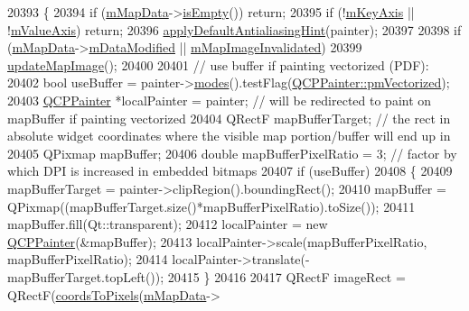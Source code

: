 \begin{DoxyCode}
20393 \{
20394   \textcolor{keywordflow}{if} (\hyperlink{class_q_c_p_color_map_a8709272aa8f0be3ca111bf3866806f8b}{mMapData}->\hyperlink{class_q_c_p_color_map_data_a986009324aee1fc5f696db46bd03dde5}{isEmpty}()) \textcolor{keywordflow}{return};
20395   \textcolor{keywordflow}{if} (!\hyperlink{class_q_c_p_abstract_plottable_a426f42e254d0f8ce5436a868c61a6827}{mKeyAxis} || !\hyperlink{class_q_c_p_abstract_plottable_a2901452ca4aea911a1827717934a4bda}{mValueAxis}) \textcolor{keywordflow}{return};
20396   \hyperlink{class_q_c_p_abstract_plottable_a76e9d6cc7972dc1528f526d163766aca}{applyDefaultAntialiasingHint}(painter);
20397   
20398   \textcolor{keywordflow}{if} (\hyperlink{class_q_c_p_color_map_a8709272aa8f0be3ca111bf3866806f8b}{mMapData}->\hyperlink{class_q_c_p_color_map_data_ad3cc682da2ac14e5acdbc05cf4d3d93b}{mDataModified} || \hyperlink{class_q_c_p_color_map_ac9aea6a5c193d7fa866bc7b26e79ef2c}{mMapImageInvalidated})
20399     \hyperlink{class_q_c_p_color_map_a5efcea591bb5486d968af520a4d43c3a}{updateMapImage}();
20400   
20401   \textcolor{comment}{// use buffer if painting vectorized (PDF):}
20402   \textcolor{keywordtype}{bool} useBuffer = painter->\hyperlink{class_q_c_p_painter_a99b89eaf5363faaa1e1e6162856f436c}{modes}().testFlag(\hyperlink{class_q_c_p_painter_a156cf16444ff5e0d81a73c615fdb156daeda679cd55dcd468341d07d48a30b6ab}{QCPPainter::pmVectorized});
20403   \hyperlink{class_q_c_p_painter}{QCPPainter} *localPainter = painter; \textcolor{comment}{// will be redirected to paint on mapBuffer if painting
       vectorized}
20404   QRectF mapBufferTarget; \textcolor{comment}{// the rect in absolute widget coordinates where the visible map portion/buffer
       will end up in}
20405   QPixmap mapBuffer;
20406   \textcolor{keywordtype}{double} mapBufferPixelRatio = 3; \textcolor{comment}{// factor by which DPI is increased in embedded bitmaps}
20407   \textcolor{keywordflow}{if} (useBuffer)
20408   \{
20409     mapBufferTarget = painter->clipRegion().boundingRect();
20410     mapBuffer = QPixmap((mapBufferTarget.size()*mapBufferPixelRatio).toSize());
20411     mapBuffer.fill(Qt::transparent);
20412     localPainter = \textcolor{keyword}{new} \hyperlink{class_q_c_p_painter}{QCPPainter}(&mapBuffer);
20413     localPainter->scale(mapBufferPixelRatio, mapBufferPixelRatio);
20414     localPainter->translate(-mapBufferTarget.topLeft());
20415   \}
20416   
20417   QRectF imageRect = QRectF(\hyperlink{class_q_c_p_abstract_plottable_ade710a776104b14c1c835168ce1bfc5c}{coordsToPixels}(\hyperlink{class_q_c_p_color_map_a8709272aa8f0be3ca111bf3866806f8b}{mMapData}->

\end{DoxyCode}
